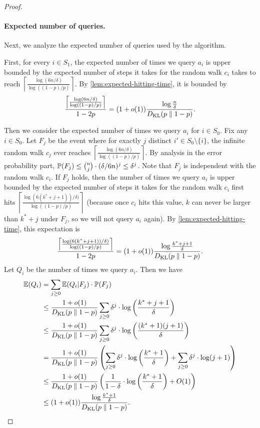 \begin{proof}
\paragraph{Expected number of queries.} Next, we analyze the expected number of queries used by the algorithm.

First, for every $i \in S_1$, the expected number of times we query $a_i$ is upper bounded by the expected number of steps it takes for the random walk $c_i$ takes to reach $\left\lceil \frac{\log (6 n / \delta)}{\log((1-p)/p)} \right\rceil$. By \cref{lem:expected-hitting-time}, it is bounded by
\[
\frac{\left\lceil \frac{\log (6 n / \delta)}{\log((1-p)/p)} \right\rceil}{1 - 2p} = (1+o(1)) \frac{\log \frac{n}{\delta}}{D_{\operatorname{\mathrm{KL}}}(p \parallel 1-p)}.
\]

Then we consider the expected number of times we query $a_i$ for $i \in S_0$. Fix any $i \in S_0$. Let $F_j$ be the event where for exactly $j$ distinct $i' \in S_0 \setminus \{i\}$, the infinite random walk $c_j$ ever reaches $\left\lceil \frac{\log (6 n / \delta)}{\log((1-p)/p)} \right\rceil$. By analysis in the error probability part, $\mathbb{P}(F_j) \le \binom{n}{j} \cdot (\delta / 6 n)^j \le \delta^j$. Note that $F_j$ is independent with the random walk $c_i$. If $F_j$ holds, then the number of times we query $a_i$ is upper bounded by the expected number of steps it takes for the random walk $c_i$ first hits $\left\lceil \frac{\log (6 (k^* + j + 1)) / \delta)}{\log((1-p)/p)} \right\rceil$ (because once $c_i$ hits this value, $k$ can never be larger than $k^* + j$ under $F_j$, so we will not query $a_i$ again). By \cref{lem:expected-hitting-time}, this expectation is
\[
\frac{\left\lceil \frac{\log (6 (k^* + j + 1)) / \delta)}{\log((1-p)/p)} \right\rceil}{1 - 2p} = (1+o(1)) \frac{\log \frac{k^* + j + 1}{\delta}}{D_{\operatorname{\mathrm{KL}}}(p \parallel 1-p)}.
\]
Let $Q_i$ be the number of times we query $a_i$. Then we have
\begin{align*}
  \mathbb{E}(Q_i) &= \sum_{j \ge 0} \mathbb{E}(Q_i | F_j) \cdot \mathbb{P}(F_j)\\
  &\le \frac{1+o(1)}{D_{\operatorname{\mathrm{KL}}}(p \parallel 1-p)} \sum_{j \ge 0}  \delta^j \cdot \log \left(\frac{k^* + j + 1}{\delta} \right)\\
  &\le \frac{1+o(1)}{D_{\operatorname{\mathrm{KL}}}(p \parallel 1-p)} \sum_{j \ge 0}  \delta^j \cdot \log \left(\frac{(k^* + 1) (j + 1)}{\delta} \right)\\
  &= \frac{1+o(1)}{D_{\operatorname{\mathrm{KL}}}(p \parallel 1-p)} \left( \sum_{j \ge 0}  \delta^j \cdot \log \left(\frac{k^* + 1}{\delta} \right) + \sum_{j \ge 0} \delta^j \cdot \log(j+1)\right) \\
  &\le \frac{1+o(1)}{D_{\operatorname{\mathrm{KL}}}(p \parallel 1-p)} \left( \frac{1}{1-\delta} \cdot \log \left(\frac{k^* + 1}{\delta} \right) + O(1)\right) \\
  &\le (1+o(1)) \frac{\log \frac{k^*+1}{\delta}}{D_{\operatorname{\mathrm{KL}}}(p \parallel 1-p)}.
\end{align*}


\end{proof}
